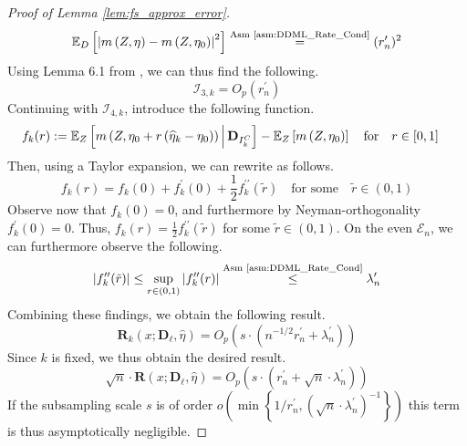 \begin{proof}[Proof of Lemma \ref{lem:fs_approx_error}]
\begin{equation}
\begin{aligned}
            \mathbb{E}_{D}\left[\left|m\left(Z, \eta\right) - m\left(Z, \eta_{0}\right)\right|^{2}\right]
            \overset{\text{Asm \ref{asm:DDML_Rate_Cond}}}{=} (r_{n}^{\prime})^{2}
        \end{aligned}
    \end{equation}
    Using Lemma 6.1 from \citet{chernozhukov_doubledebiased_2018}, we can thus find the following.
    \begin{equation}
        \mathcal{I}_{3,k} = O_{p}(r_{n}^{\prime})
    \end{equation}
    Continuing with $\mathcal{I}_{4,k}$, introduce the following function.
    \begin{equation}
        \begin{aligned}
            f_{k}(r) 
            & := \mathbb{E}_{Z}\left[m\left(Z, \eta_{0} + r \left(\widehat{\eta}_{k} - \eta_{0}\right)\right) \, \middle| \, \mathbf{D}_{I_{k}^{C}}\right] - \mathbb{E}_{Z}\left[m\left(Z, \eta_{0}\right) \right] 
            \quad \text{for} \quad r \in [0,1]
        \end{aligned}
    \end{equation}
    Then, using a Taylor expansion, we can rewrite as follows.
    \begin{equation}
        f_{k}(r) = f_{k}(0) + f_{k}^{\prime}(0) + \frac{1}{2} f_{k}^{\prime\prime}(\tilde{r})
        \quad \text{for some} \quad \tilde{r} \in (0,1)
    \end{equation}
    Observe now that $f_{k}(0) = 0$, and furthermore by Neyman-orthogonality $f_{k}^{\prime}(0) = 0$.
    Thus, $f_{k}(r) = \frac{1}{2} f_{k}^{\prime\prime}(\tilde{r})$ for some $\tilde{r} \in (0,1)$.
    On the even $\mathcal{E}_{n}$, we can furthermore observe the following.
    \begin{equation}
        \left| f_{k}^{\prime\prime}(\tilde{r}) \right| 
        \leq \sup_{r \in (0,1)} \left| f_{k}^{\prime\prime}(r) \right|
        \overset{\text{Asm \ref{asm:DDML_Rate_Cond}}}{\leq} \lambda_{n}^{\prime}
    \end{equation}
    Combining these findings, we obtain the following result.
    \begin{equation}
         \mathbf{R}_{k}\left(x; \mathbf{D}_{\ell}, \hat{\eta}\right)
         = O_{p}\left(s \cdot \left(n^{-1/2} r_{n}^{\prime} + \lambda_{n}^{\prime}\right)\right)
    \end{equation}
    Since $k$ is fixed, we thus obtain the desired result.
    \begin{equation}
        \sqrt{n} \cdot \mathbf{R}\left(x; \mathbf{D}_{\ell}, \hat{\eta}\right)
         = O_{p}\left(s \cdot \left(r_{n}^{\prime} + \sqrt{n} \cdot \lambda_{n}^{\prime}\right)\right)
    \end{equation}
    If the subsampling scale $s$ is of order $o\left(\min\left\{1/r_{n}^{\prime}, \left(\sqrt{n} \cdot \lambda_{n}^{\prime}\right)^{-1}\right\}\right)$ this term is thus asymptotically negligible.
\end{proof}


